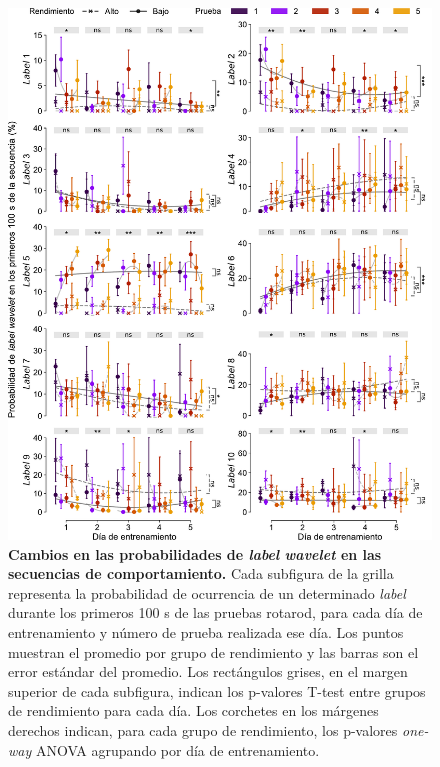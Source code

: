 \begin{figure}[htbp]
    \centering
    \includegraphics[width=0.99\linewidth]{figuras/capitulo4/probabilidades_labels_wav.pdf}
    \caption{\textbf{Cambios en las probabilidades de \textit{label} \textit{wavelet} en las secuencias de comportamiento.} Cada subfigura de la grilla representa la probabilidad de ocurrencia de un determinado \textit{label} durante los primeros 100 s de las pruebas rotarod, para cada día de entrenamiento y número de prueba realizada ese día. Los puntos muestran el promedio por grupo de rendimiento y las barras son el error estándar del promedio. Los rectángulos grises, en el margen superior de cada subfigura, indican los p-valores T-test entre grupos de rendimiento para cada día. Los corchetes en los márgenes derechos indican, para cada grupo de rendimiento, los p-valores \textit{one-way} ANOVA agrupando por día de entrenamiento.}
    \label{fig:capitulo4_probabilidades_labels_wav}
\end{figure}

